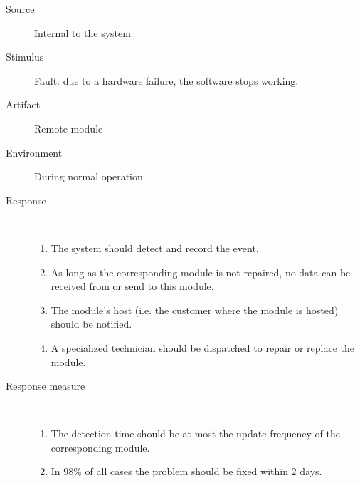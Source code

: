 \begin{description}
	\item[Source] Internal to the system
	\item[Stimulus] Fault: due to a hardware failure, the software stops working.
	\item[Artifact] Remote module 
	\item[Environment] During normal operation 
	\item[Response] \ %
	\begin{enumerate}
	  \item The system should detect and record the event.
	  \item As long as the corresponding module is not repaired, no data can
	  be received from or send to this module.
	  \item The module's host (i.e. the customer where the module is hosted) should
	  be notified.
	  \item A specialized technician should be dispatched to repair or replace the
	  module.
	\end{enumerate}
	\item[Response measure] \ 
	\begin{enumerate}
	  \item The detection time should be at most the update frequency of the
	  corresponding module.
	  \item In 98\% of all cases the problem should be fixed within 2 days.
	\end{enumerate}
\end{description}